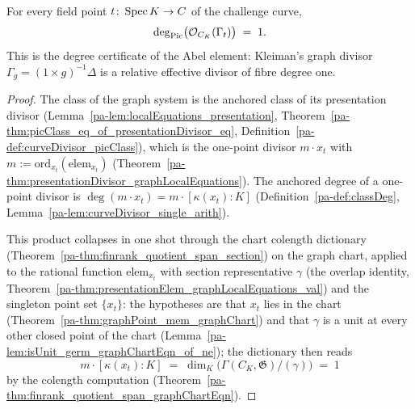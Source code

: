 \begin{theorem}
  \label{pa-thm:classDeg_graphPicClass}
  \leanok

  For every field point \(t \colon \operatorname{Spec} K \to C\) of the challenge curve,
  \[
    \deg_{\operatorname{Pic}}\bigl(\mathcal{O}_{C_K}(\Gamma_t)\bigr) \;=\; 1 .
  \]
  This is the degree certificate of the Abel element: Kleiman's graph divisor
  \(\Gamma_g = (1 \times g)^{-1}\Delta\) is a relative effective divisor of fibre degree
  one.
\end{theorem}
\begin{proof}
  \leanok
  The class of the graph system is the anchored class of its presentation divisor
  (Lemma~\ref{pa-lem:localEquations_presentation},
  Theorem~\ref{pa-thm:picClass_eq_of_presentationDivisor_eq},
  Definition~\ref{pa-def:curveDivisor_picClass}), which is the one-point divisor
  \(m \cdot x_t\) with \(m := \mathrm{ord}_{x_t}(\mathrm{elem}_{x_t})\)
  (Theorem~\ref{pa-thm:presentationDivisor_graphLocalEquations}). The anchored degree of a
  one-point divisor is \(\deg(m \cdot x_t) = m \cdot [\kappa(x_t) : K]\)
  (Definition~\ref{pa-def:classDeg}, Lemma~\ref{pa-lem:curveDivisor_single_arith}).

  This product collapses in one shot through the chart colength dictionary
  (Theorem~\ref{pa-thm:finrank_quotient_span_section}) on the graph chart, applied to the
  rational function \(\mathrm{elem}_{x_t}\) with section representative \(\gamma\)
  (the overlap identity, Theorem~\ref{pa-thm:presentationElem_graphLocalEquations_val}) and
  the singleton point set \(\{x_t\}\): the hypotheses are that \(x_t\) lies in the chart
  (Theorem~\ref{pa-thm:graphPoint_mem_graphChart}) and that \(\gamma\) is a unit at every
  other closed point of the chart (Lemma~\ref{pa-lem:isUnit_germ_graphChartEqn_of_ne}); the
  dictionary then reads
  \[
    m \cdot [\kappa(x_t):K]
      \;=\; \dim_K\bigl(\Gamma(C_K, \mathfrak G)/(\gamma)\bigr)
      \;=\; 1
  \]
  by the colength computation
  (Theorem~\ref{pa-thm:finrank_quotient_span_graphChartEqn}).
\end{proof}
